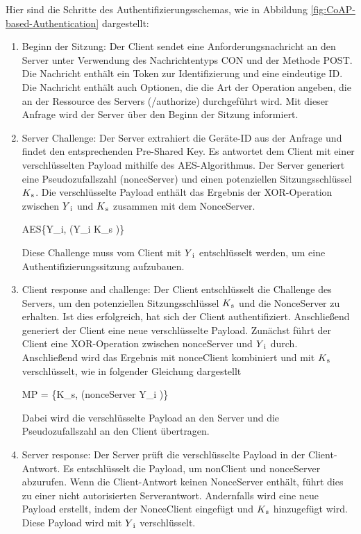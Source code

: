 Hier sind die Schritte des Authentifizierungsschemas, wie in Abbildung \ref{fig:CoAP-based-Authentication} dargestellt:

\begin{enumerate}
    \item Beginn der Sitzung:
    Der Client sendet eine Anforderungsnachricht an den Server unter Verwendung des Nachrichtentyps CON und der Methode POST. Die Nachricht enthält ein Token zur Identifizierung und eine eindeutige ID. Die Nachricht enthält auch Optionen, die die Art der Operation angeben, die an der Ressource des Servers (/authorize) durchgeführt wird. Mit dieser Anfrage wird der Server über den Beginn der Sitzung informiert.

    \item Server Challenge:
    Der Server extrahiert die Geräte-ID aus der Anfrage und findet den entsprechenden Pre-Shared Key. Es antwortet dem Client mit einer verschlüsselten Payload mithilfe des AES-Algorithmus. Der Server generiert eine Pseudozufallszahl (nonceServer) und einen potenziellen Sitzungsschlüssel \(K\textsubscript{s}\). Die verschlüsselte Payload enthält das Ergebnis der XOR-Operation zwischen \(Y\textsubscript{i}\) und \(K\textsubscript{s}\) zusammen mit dem NonceServer.
    
  AES\{Y_{i}, (Y_{i} \oplus K_{s} \mid {})\}

     
    Diese Challenge muss vom Client mit \(Y\textsubscript{i}\)  entschlüsselt werden, um eine Authentifizierungssitzung aufzubauen.

    \item Client response and challenge: Der Client entschlüsselt die Challenge des Servers, um den potenziellen Sitzungsschlüssel \(K\textsubscript{s}\)  und die NonceServer zu erhalten. Ist dies erfolgreich, hat sich der Client authentifiziert. Anschließend generiert der Client eine neue verschlüsselte Payload.  Zunächst führt der Client eine XOR-Operation zwischen nonceServer und \(Y\textsubscript{i}\)  durch. Anschließend wird das Ergebnis mit nonceClient kombiniert und mit \(K\textsubscript{s}\)  verschlüsselt, wie in folgender Gleichung dargestellt  

MP = \{K_{s}, (nonceServer \oplus Y_{i} \mid {})\}


Dabei wird die verschlüsselte Payload an den Server und die Pseudozufallszahl an den Client übertragen.

    \item Server response: Der Server prüft die verschlüsselte Payload in der Client-Antwort. Es entschlüsselt die Payload, um nonClient und nonceServer abzurufen. Wenn die Client-Antwort keinen NonceServer enthält, führt dies zu einer nicht autorisierten Serverantwort. Andernfalls wird eine neue Payload erstellt, indem der NonceClient eingefügt und \(K\textsubscript{s}\) hinzugefügt wird. Diese Payload wird mit \(Y\textsubscript{i}\) verschlüsselt.
    

\end{enumerate}
